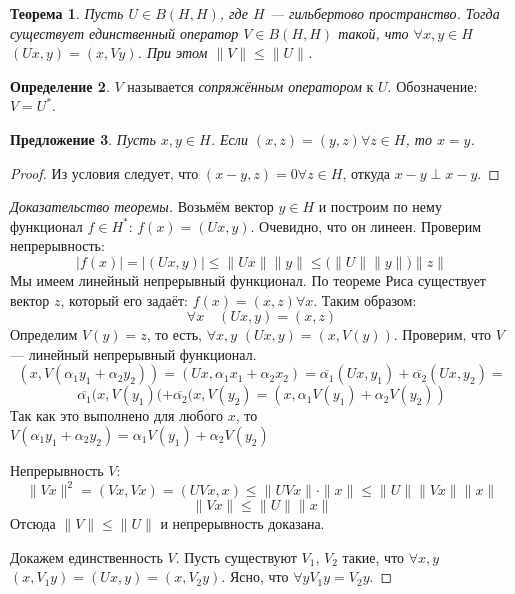 \documentclass[11pt,openany,a4paper]{scrartcl}
\theoremstyle{plain}
\newtheorem{theorem}{Теорема}[subsection]
\newtheorem{proposition}[theorem]{Предложение}
\theoremstyle{definition}
\newtheorem{definition}[theorem]{Определение}
\newcommand\ol{\overline}
\begin{document}
\begin{theorem}
    Пусть $U \in B(H, H)$, где $H$ — гильбертово пространство. Тогда существует
    единственный оператор $V \in B(H, H)$ такой, что $\forall x,y \in H$
    $(Ux, y) = (x, Vy)$. При этом $\|V\| \leqslant \|U\|$.
\end{theorem}
\begin{definition}
    $V$ называется \emph{сопряжённым оператором} к $U$. Обозначение: $V = U^\ast$.
\end{definition}
\begin{proposition}
    Пусть $x, y \in H$. Если $(x, z) = (y, z) \forall z \in H$, то $x = y$.
\end{proposition}
\begin{proof}
    Из условия следует, что $(x - y, z) = 0 \forall z \in H$, откуда
    $x - y \perp x - y$.
\end{proof}
\begin{proof}[Доказательство теоремы]
    Возьмём вектор $y \in H$ и построим по нему функционал $f \in H^\ast$:
    $f(x) = (Ux, y)$. Очевидно, что он линеен. Проверим непрерывность:
    $$
    |f(x)| = |(Ux, y)| \leqslant \|Ux\|\|y\| \leqslant \big(\|U\|\|y\|\big)\|z\|
    $$
    Мы имеем линейный непрерывный функционал. По теореме Риса существует вектор
    $z$, который его задаёт: $f(x) = (x, z) \forall x$. Таким образом:
    $$
    \forall x\quad (Ux, y) = (x, z)
    $$
    Определим $V(y) = z$, то есть, $\forall x,y$ $(Ux, y) = (x, V(y))$.
    Проверим, что $V$ — линейный непрерывный функционал.
    $$
    (x, V(\alpha_1y_1 + \alpha_2y_2)) = (Ux, \alpha_1x_1 + \alpha_2x_2) =
    \ol{\alpha_1}(Ux, y_1) + \ol{\alpha_2}(Ux, y_2) =
    $$
    $$
    \ol{\alpha_1}(x, V(y_1)( + \ol{\alpha_2}(x, V(y_2) =
    (x, \alpha_1V(y_1) + \alpha_2V(y_2))
    $$
    Так как это выполнено для любого $x$, то $V(\alpha_1y_1 + \alpha_2y_2) =
    \alpha_1V(y_1) + \alpha_2V(y_2)$
    
    Непрерывность $V$:
    $$
    \|Vx\|^2 = (Vx, Vx) = (UVx, x) \leqslant \|UVx\|\cdot\|x\| \leqslant
    \|U\|\|Vx\|\|x\|
    $$
    $$
    \|Vx\| \leqslant \|U\|\|x\|
    $$
    Отсюда $\|V\| \leqslant \|U\|$ и непрерывность доказана.
    
    Докажем единственность $V$. Пусть существуют $V_1$, $V_2$ такие, что
    $\forall x,y$ $(x, V_1y) = (Ux, y) = (x, V_2y)$. Ясно, что $\forall y
    V_1y = V_2y$.
\end{proof}
\end{document}
